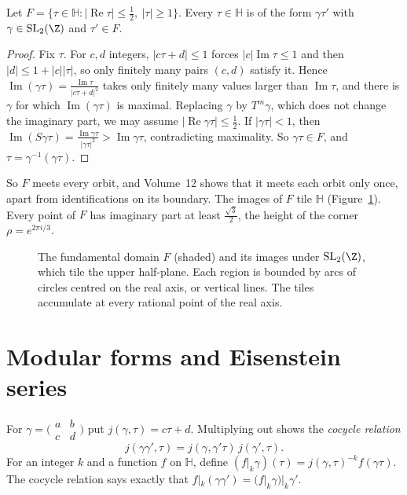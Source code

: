 \begin{theorem}\label{thm:fundamental}
Let $F=\{\tau\in\mathbb H:|\operatorname{Re}\tau|\le\frac12,\ |\tau|\ge1\}$. Every $\tau\in\mathbb H$ is of the form $\gamma\tau'$ with $\gamma\in\mathrm{SL}_2(\Z)$ and $\tau'\in F$.
\end{theorem}

\begin{proof}
Fix $\tau$. For $c,d$ integers, $|c\tau+d|\le1$ forces $|c|\operatorname{Im}\tau\le1$ and then $|d|\le1+|c||\tau|$, so only finitely many pairs $(c,d)$ satisfy it. Hence $\operatorname{Im}(\gamma\tau)=\frac{\operatorname{Im}\tau}{|c\tau+d|^2}$
takes only finitely many values larger than $\operatorname{Im}\tau$, and there is $\gamma$ for which $\operatorname{Im}(\gamma\tau)$ is maximal. Replacing $\gamma$ by $T^m\gamma$, which does not change the imaginary part, we may assume $|\operatorname{Re}\gamma\tau|\le\frac12$.
If $|\gamma\tau|<1$, then $\operatorname{Im}(S\gamma\tau)=\frac{\operatorname{Im}\gamma\tau}{|\gamma\tau|^2}>\operatorname{Im}\gamma\tau$, contradicting maximality. So $\gamma\tau\in F$, and $\tau=\gamma^{-1}(\gamma\tau)$.
\end{proof}

So $F$ meets every orbit, and Volume~12 shows that it meets each orbit only once, apart from identifications on its boundary. The images of $F$ tile $\mathbb H$ (Figure~\ref{fig:tessellation}). Every point of $F$
has imaginary part at least $\frac{\sqrt3}2$, the height of the corner $\rho=e^{2\pi i/3}$.

\begin{figure}[ht]
\centering
{}
\caption{The fundamental domain $F$ (shaded) and its images under $\mathrm{SL}_2(\Z)$, which tile the upper half-plane. Each region is bounded by arcs of circles centred on the real axis, or vertical lines. The tiles
accumulate at every rational point of the real axis.}
\label{fig:tessellation}
\end{figure}

\section{Modular forms and Eisenstein series}

For $\gamma=\bigl(\begin{smallmatrix}a&b\\c&d\end{smallmatrix}\bigr)$ put $j(\gamma,\tau)=c\tau+d$. Multiplying out shows the \emph{cocycle relation}
\[
j(\gamma\gamma',\tau)=j(\gamma,\gamma'\tau)\,j(\gamma',\tau).
\]
For an integer $k$ and a function $f$ on $\mathbb H$, define $(f|_k\gamma)(\tau)=j(\gamma,\tau)^{-k}f(\gamma\tau)$. The cocycle relation says exactly that $f|_k(\gamma\gamma')=(f|_k\gamma)|_k\gamma'$.

